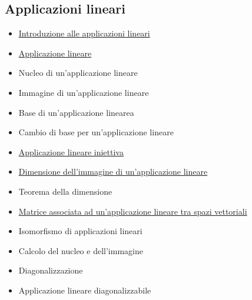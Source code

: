 \documentclass[a4paper,10pt]{article}
\begin{document}
\subsection{Applicazioni lineari}
  \begin{itemize}
   \item \href{IntroAppLineari.html}{Introduzione alle applicazioni lineari}
   \item \href{ApplicazioneLineare.html}{Applicazione lineare}
   \item Nucleo di un'applicazione lineare
   \item Immagine di un'applicazione lineare
   \item Base di un'applicazione linearea
   \item Cambio di base per un'applicazione lineare
   \item \href{ApplicazioneIniettiva.html}{Applicazione lineare iniettiva}
   \item \href{DimensioneImmagine.html}{Dimensione dell'immagine di un'applicazione lineare}
   \item Teorema della dimensione
   \item \href{MatriceApplicazione.html}{Matrice associata ad un'applicazione lineare tra spazi vettoriali}
   \item Isomorfismo di applicazioni lineari
   \item Calcolo del nucleo e dell'immagine
   \item Diagonalizzazione
   \item Applicazione lineare diagonalizzabile
  \end{itemize}
\end{document}
